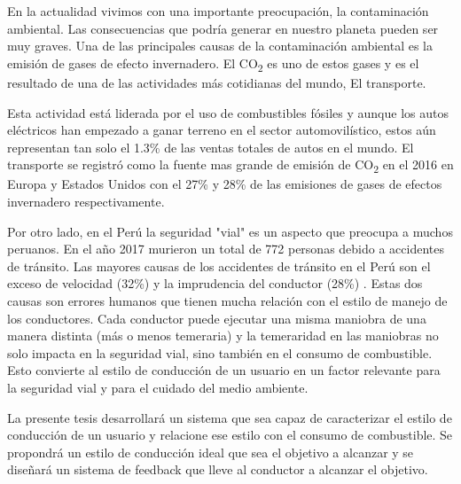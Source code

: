 \begin{introduction}

En la actualidad vivimos con una importante preocupación, la contaminación ambiental. Las consecuencias que podría generar en nuestro planeta pueden ser muy graves. Una de las principales causas de la contaminación ambiental es la emisión de gases de efecto invernadero. El CO\textsubscript{2} es uno de estos gases y es el resultado de una de las actividades más cotidianas del mundo, El transporte.

Esta actividad está liderada por el uso de combustibles fósiles y aunque los autos eléctricos han empezado a ganar terreno en el sector automovilístico, estos aún representan tan solo el 1.3\% de las ventas totales de autos en el mundo.  El transporte se registró como la fuente mas grande de emisión de CO\textsubscript{2} en el 2016 en Europa y Estados Unidos con el 27\% y 28\% de las emisiones de gases de efectos invernadero respectivamente.

Por otro lado, en el Perú la seguridad "vial"  es un aspecto que preocupa a muchos peruanos. En el año 2017 murieron un total de 772 personas debido a accidentes de tránsito. Las mayores causas de los accidentes de tránsito en el Perú son el exceso de velocidad (32\%) y la imprudencia del conductor (28\%) . Estas dos causas son errores humanos que tienen mucha relación con el estilo de manejo de los conductores. Cada conductor puede ejecutar una misma maniobra de una manera distinta (más o menos temeraria) y la temeraridad en las maniobras no solo impacta en la seguridad vial, sino también en el consumo de combustible. Esto convierte al estilo de conducción de un usuario en un factor relevante para la seguridad vial y para el cuidado del medio ambiente.

La presente tesis desarrollará un sistema que sea capaz de caracterizar el estilo de conducción de un usuario y  relacione ese estilo con el consumo de combustible. Se propondrá un estilo de conducción ideal que sea el objetivo a alcanzar y se diseñará un sistema de feedback que lleve al conductor a alcanzar el objetivo.


\end{introduction}
